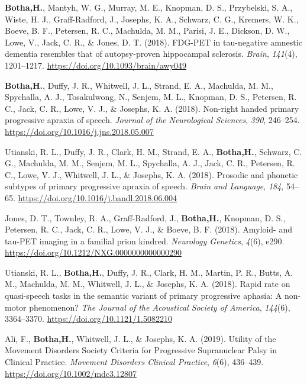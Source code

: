 \documentclass[11pt, a4paper]{awesome-cv}
\begin{document}
\leavevmode\hypertarget{ref-botha_fdg-pet_2018}{}%
\textbf{Botha,H.}, Mantyh, W. G., Murray, M. E., Knopman, D. S.,
Przybelski, S. A., Wiste, H. J., Graff-Radford, J., Josephs, K. A.,
Schwarz, C. G., Kremers, W. K., Boeve, B. F., Petersen, R. C., Machulda,
M. M., Parisi, J. E., Dickson, D. W., Lowe, V., Jack, C. R., \& Jones,
D. T. (2018). {FDG}-{PET} in tau-negative amnestic dementia resembles
that of autopsy-proven hippocampal sclerosis. \emph{Brain},
\emph{141}(4), 1201--1217. \url{https://doi.org/10.1093/brain/awy049}

\leavevmode\hypertarget{ref-botha_non-right_2018}{}%
\textbf{Botha,H.}, Duffy, J. R., Whitwell, J. L., Strand, E. A.,
Machulda, M. M., Spychalla, A. J., Tosakulwong, N., Senjem, M. L.,
Knopman, D. S., Petersen, R. C., Jack, C. R., Lowe, V. J., \& Josephs,
K. A. (2018). Non-right handed primary progressive apraxia of speech.
\emph{Journal of the Neurological Sciences}, \emph{390}, 246--254.
\url{https://doi.org/10.1016/j.jns.2018.05.007}

\leavevmode\hypertarget{ref-utianski_prosodic_2018}{}%
Utianski, R. L., Duffy, J. R., Clark, H. M., Strand, E. A.,
\textbf{Botha,H.}, Schwarz, C. G., Machulda, M. M., Senjem, M. L.,
Spychalla, A. J., Jack, C. R., Petersen, R. C., Lowe, V. J., Whitwell,
J. L., \& Josephs, K. A. (2018). Prosodic and phonetic subtypes of
primary progressive apraxia of speech. \emph{Brain and Language},
\emph{184}, 54--65. \url{https://doi.org/10.1016/j.bandl.2018.06.004}

\leavevmode\hypertarget{ref-jones_amyloid-_2018}{}%
Jones, D. T., Townley, R. A., Graff-Radford, J., \textbf{Botha,H.},
Knopman, D. S., Petersen, R. C., Jack, C. R., Lowe, V. J., \& Boeve, B.
F. (2018). Amyloid- and tau-{PET} imaging in a familial prion kindred.
\emph{Neurology Genetics}, \emph{4}(6), e290.
\url{https://doi.org/10.1212/NXG.0000000000000290}

\leavevmode\hypertarget{ref-utianski_rapid_2018}{}%
Utianski, R. L., \textbf{Botha,H.}, Duffy, J. R., Clark, H. M., Martin,
P. R., Butts, A. M., Machulda, M. M., Whitwell, J. L., \& Josephs, K. A.
(2018). Rapid rate on quasi-speech tasks in the semantic variant of
primary progressive aphasia: {A} non-motor phenomenon? \emph{The Journal
of the Acoustical Society of America}, \emph{144}(6), 3364--3370.
\url{https://doi.org/10.1121/1.5082210}

\leavevmode\hypertarget{ref-ali_utility_2019}{}%
Ali, F., \textbf{Botha,H.}, Whitwell, J. L., \& Josephs, K. A. (2019).
Utility of the {Movement} {Disorders} {Society} {Criteria} for
{Progressive} {Supranuclear} {Palsy} in {Clinical} {Practice}.
\emph{Movement Disorders Clinical Practice}, \emph{6}(6), 436--439.
\url{https://doi.org/10.1002/mdc3.12807}
\end{document}
